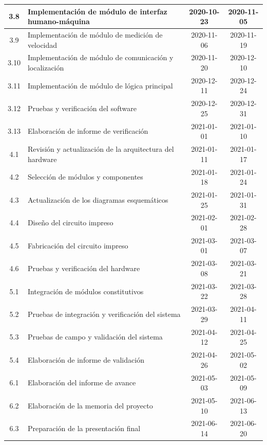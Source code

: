 \documentclass[11pt]{charter}
\begin{document}
\begin{table}[htpb]
\begin{tabularx}{\linewidth}{@{}|c|X|c|c|@{}}
  3.8  & Implementación de módulo de interfaz humano-máquina      & 2020-10-23 & 2020-11-05 \\ \hline
  3.9  & Implementación de módulo de medición de velocidad        & 2020-11-06 & 2020-11-19 \\ \hline
  3.10 & Implementación de módulo de comunicación y localización  & 2020-11-20 & 2020-12-10 \\ \hline
  3.11 & Implementación de módulo de lógica principal             & 2020-12-11 & 2020-12-24 \\ \hline
  3.12 & Pruebas y verificación del software                      & 2020-12-25 & 2020-12-31 \\ \hline
  3.13 & Elaboración de informe de verificación                   & 2021-01-01 & 2021-01-10 \\ \hline
  4.1  & Revisión y actualización de la arquitectura del hardware & 2021-01-11 & 2021-01-17 \\ \hline
  4.2  & Selección de módulos y componentes                       & 2021-01-18 & 2021-01-24 \\ \hline
  4.3  & Actualización de los diagramas esquemáticos              & 2021-01-25 & 2021-01-31 \\ \hline
  4.4  & Diseño del circuito impreso                              & 2021-02-01 & 2021-02-28 \\ \hline
  4.5  & Fabricación del circuito impreso                         & 2021-03-01 & 2021-03-07 \\ \hline
  4.6  & Pruebas y verificación del hardware                      & 2021-03-08 & 2021-03-21 \\ \hline
  5.1  & Integración de módulos constitutivos                     & 2021-03-22 & 2021-03-28 \\ \hline
  5.2  & Pruebas de integración y verificación del sistema        & 2021-03-29 & 2021-04-11 \\ \hline
  5.3 & Pruebas de campo y validación del sistema                 & 2021-04-12 & 2021-04-25 \\ \hline
  5.4 & Elaboración de informe de validación                      & 2021-04-26 & 2021-05-02 \\ \hline
  6.1 & Elaboración del informe de avance                         & 2021-05-03 & 2021-05-09 \\ \hline
  6.2 & Elaboración de la memoria del proyecto                    & 2021-05-10 & 2021-06-13 \\ \hline
  6.3 & Preparación de la presentación final                      & 2021-06-14 & 2021-06-20 \\ \hline
  \end{tabularx}
  \label{tab:gantt}
\end{table}
\end{document}
